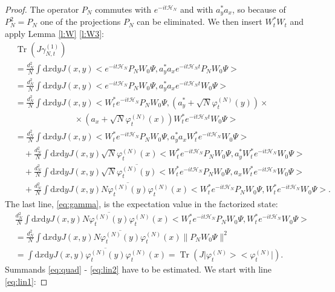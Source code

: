 \documentclass[11pt,a4paper,draft,DIV11]{scrartcl}	%
\newcommand{\di}{\textrm{d}}		%
\newcommand{\Hcal}{\mathcal{H}}		%
\newcommand{\scal}[2]{\big<#1,#2\big>} %
\newcommand{\cc}[1]{\overline{#1}}	%
\newcommand{\norm}[1]{\lVert#1\rVert}	%
\newcommand{\ph}{\varphi_t^{(N)}}	%
\newcommand{\project}[1]{\lvert #1 \big>\big< #1\rvert}	%
\newcommand{\Tr}{\operatorname{Tr}}	%
\begin{document}
\begin{proof}
The operator $P_N$ commutes with $e^{-it \Hcal_N}$ and with $a^\ast_y a_x$, so because of $P_N^2 = P_N$ one of the projections $P_N$ can be eliminated. We then insert $W^\ast_t W_t$ and apply Lemma \ref{l:W} \ref{l:W3}:
\begin{align}
& \Tr\left(J\gamma_{N,t}^{(1)}\right) \nonumber\\
& = \frac{d_N^2}{N} \int \di x\di y J(x,y) \scal{e^{-it\Hcal_N}P_N W_0 \Psi}{ a^\ast_y a_x e^{-it\Hcal_N t}P_N W_0 \Psi} \nonumber\\
& = \frac{d_N^2}{N} \int \di x\di y J(x,y) \scal{e^{-it\Hcal_N}P_N W_0 \Psi}{ a^\ast_y a_x e^{-it\Hcal_N t}W_0 \Psi} \nonumber\\
& = \frac{d_N^2}{N} \int \di x\di y J(x,y) \scal{W^\ast_t e^{-it\Hcal_N}P_N W_0 \Psi}{\left(a^\ast_y + \sqrt{N} \ph(y) \right) \times \nonumber\\
& \qquad\qquad\qquad\quad \times \left(a_x + \sqrt{N} \ph(x) \right) W^\ast_t e^{-it\Hcal_N t}W_0 \Psi} \nonumber\\
& = \frac{d_N^2}{N} \int \di x\di y J(x,y) \scal{W^\ast_t e^{-it\Hcal_N}P_N W_0 \Psi}{a^\ast_y a_x W^\ast_t e^{-it \Hcal_N} W_0 \Psi} \label{eq:quad}\\
& \quad + \frac{d_N^2}{N} \int \di x\di y J(x,y) \sqrt{N} \ph(x) \scal{W^\ast_t e^{-it\Hcal_N} P_N W_0 \Psi}{a^\ast_y W^\ast_t e^{-it \Hcal_N} W_0 \Psi} \label{eq:lin1} \\
& \quad + \frac{d_N^2}{N} \int \di x\di y J(x,y) \sqrt{N} \cc{\ph(y)} \scal{W^\ast_t e^{-it\Hcal_N}P_N W_0 \Psi}{a_x W^\ast_t e^{-it\Hcal_N} W_0 \Psi} \label{eq:lin2} \\
& \quad + \frac{d_N^2}{N} \int \di x\di y J(x,y) N \cc{\ph(y)}\ph(x) \scal{W^\ast_t e^{-it\Hcal_N} P_N W_0 \Psi}{W^\ast_t e^{-it\Hcal_N} W_0 \Psi}. \label{eq:gamma}
\end{align}
The last line, \eqref{eq:gamma}, is the expectation value in the factorized state:
\begin{align*}
& \frac{d_N^2}{N} \int \di x\di y J(x,y) N \cc{\ph(y)}\ph(x) \scal{W^\ast_t e^{-it\Hcal_N} P_N W_0 \Psi}{W^\ast_t e^{-it\Hcal_N} W_0 \Psi} \\
& = \frac{d_N^2}{N} \int \di x\di y J(x,y) N \cc{\ph(y)}\ph(x) \norm{P_N W_0 \Psi}^2 \\
& = \int \di x\di y J(x,y) \cc{\ph(y)} \ph(x) = \Tr\left( J\project{\ph} \right).
\end{align*}
Summands \eqref{eq:quad} - \eqref{eq:lin2} have to be estimated. We start with line \eqref{eq:lin1}:

\end{proof}
\end{document}
